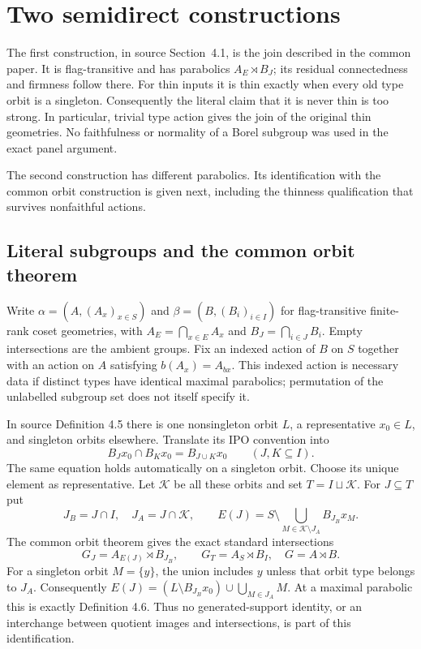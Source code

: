 \section{Two semidirect constructions}\label{sec:app-twists}
The first construction, in source Section~4.1, is the join described in the common paper. It is flag-transitive and has parabolics $A_E\rtimes B_J$; its residual connectedness and firmness follow there. For thin inputs it is thin exactly when every old type orbit is a singleton. Consequently the literal claim that it is never thin is too strong. In particular, trivial type action gives the join of the original thin geometries. No faithfulness or normality of a Borel subgroup was used in the exact panel argument.

The second construction has different parabolics. Its identification with the common orbit construction is given next, including the thinness qualification that survives nonfaithful actions.

\subsection{Literal subgroups and the common orbit theorem}
Write $\alpha=(A,(A_x)_{x\in S})$ and
$\beta=(B,(B_i)_{i\in I})$ for flag-transitive finite-rank coset
geometries, with $A_E=\bigcap_{x\in E}A_x$ and
$B_J=\bigcap_{i\in J}B_i$. Empty intersections are the ambient
groups. Fix an indexed action of $B$ on $S$ together with an action
on $A$ satisfying $b(A_x)=A_{bx}$. This indexed action is necessary
data if distinct types have identical maximal parabolics; permutation
of the unlabelled subgroup set does not itself specify it.

In source Definition 4.5 there is one nonsingleton orbit $L$, a
representative $x_0\in L$, and singleton orbits elsewhere. Translate
its IPO convention into
\[
 B_Jx_0\cap B_Kx_0=B_{J\cup K}x_0
 \qquad(J,K\subseteq I).
\]
The same equation holds automatically on a singleton orbit. Choose
its unique element as representative. Let $\mathcal K$ be all these
orbits and set $T=I\sqcup\mathcal K$. For $J\subseteq T$ put
\[
 J_B=J\cap I,\quad J_A=J\cap\mathcal K,\qquad
 E(J)=S\setminus\bigcup_{M\in\mathcal K\setminus J_A}B_{J_B}x_M.
\]
The common orbit theorem gives the exact standard intersections
\begin{equation}\label{B-eq:intersection}
 G_J=A_{E(J)}\rtimes B_{J_B},\qquad
 G_T=A_S\rtimes B_I,
 \quad G=A\rtimes B.
\end{equation}
For a singleton orbit $M=\{y\}$, the union includes $y$ unless that
orbit type belongs to $J_A$. Consequently
$E(J)=(L\setminus B_{J_B}x_0)\cup\bigcup_{M\in J_A}M$.
At a maximal parabolic this is exactly Definition 4.6. Thus no
generated-support identity, or an interchange between quotient
images and intersections, is part of this identification.

